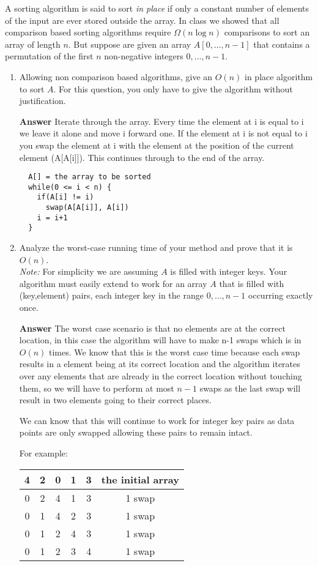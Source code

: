 \documentclass[12pt]{article}
\begin{document}
A sorting algorithm is said to sort \emph{in place} if only a constant
number of elements of the input are ever stored outside the array. In class we
showed that all comparison based sorting algorithms require $\Omega (n \log
n)$ comparisons to sort an array of length $n$. But suppose are given an array
$A [0, \ldots, n - 1]$ that contains a permutation of the first $n$
non-negative integers $0,\dots,n-1$.
\begin{enumerate}
  \item Allowing non comparison based algorithms, give an $O (n)$ in place
  algorithm to sort $A$. For this question, you only have to give the
  algorithm without justification.

  \textbf{Answer} Iterate through the array. Every time the element at i is equal to i we leave it alone and move i forward one. If the element at i is not equal to i you swap the element at i with the element at the position of the current element (A[A[i]]). This continues through to the end of the array.

\begin{verbatim}
  A[] = the array to be sorted
  while(0 <= i < n) {
    if(A[i] != i)
      swap(A[A[i]], A[i])
    i = i+1
  }
\end{verbatim}

  \item Analyze the worst-case running time of your method and prove that it
  is $O (n)$.\\
\emph{Note:} For simplicity we are assuming $A$ is filled with integer
keys. Your algorithm must easily extend to work for an array $A$ that is
filled with (key,element) pairs, each integer key in the range
$0, \ldots, n - 1$ occurring exactly once.

  \textbf{Answer} The worst case scenario is that no elements are at the correct location, in this case the algorithm will have to make n-1 swaps which is in $O(n)$ times. We know that this is the worst case time because each swap results in a element being at its correct location and the algorithm iterates over any elements that are already in the correct location without touching them, so we will have to perform at most $n-1$ swaps as the last swap will result in two elements going to their correct places.

  We can know that this will continue to work for integer key pairs as data points are only swapped allowing these pairs to remain intact.

  For example:

\begin{tabular}{ c c c c c |c}
   4 & 2 & 0 & 1 & 3 & the initial array \\
   \hline
   0 & 2 & 4 & 1 & 3 & 1 swap\\
   0 & 1 & 4 & 2 & 3 & 1 swap\\
   0 & 1 & 2 & 4 & 3 & 1 swap\\
   0 & 1 & 2 & 3 & 4 & 1 swap\\
\end{tabular}


\end{enumerate}
\end{document}
